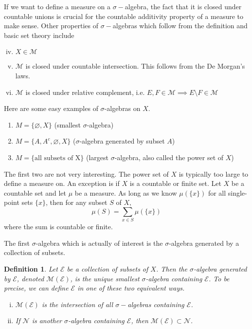\documentclass[12pt]{amsart}         %
\newtheorem{definition}{Definition}[section]
\theoremstyle{remark}
\begin{document}
If we want to define a measure on a $\sigma-$algebra, the fact that it is closed under countable unions is crucial for the countable additivity property of a measure to make sense. Other properties of $\sigma-$algebras which follow from the definition and basic set theory include
\begin{enumerate}[(i)]\setcounter{enumi}{3}
	\item $X \in \mathcal{M}$ 
	\item $\mathcal{M}$ is closed under countable intersection. This follows from the De Morgan's laws.
	\item $\mathcal{M}$ is closed under relative complement, i.e. $E, F \in \mathcal{M} \implies E \setminus F \in \mathcal{M}$
\end{enumerate}

Here are some easy examples of $\sigma$-algebras on $X$.
\begin{enumerate}
    \item $M = \{ \varnothing, X \}$ (smallest $\sigma$-algebra)
    \item $M = \{ A, A^c, \varnothing, X\}$ ($\sigma$-algebra generated by subset $A$)
    \item $M = \{ \text{all subsets of X} \}$ (largest $\sigma$-algebra, also called the power set of $X$)
\end{enumerate}

The first two are not very interesting. The power set of $X$ is typically too large to define a measure on. An exception is if $X$ is a countable or finite set. Let $X$ be a countable set and let $\mu$ be a measure. As long as we know $\mu(\{x\})$ for all single-point sets $\{x\}$, then for any subset $S$ of $X$,
\[
\mu(S) = \sum_{x \in S} \mu(\{x\})
\]
where the sum is countable or finite.

The first $\sigma$-algebra which is actually of interest is the $\sigma$-algebra generated by a collection of subsets.

\begin{definition}Let $\mathcal{E}$ be a collection of subsets of $X$. Then the \emph{$\sigma$-algebra generated by $\mathcal{E}$}, denoted $\mathcal{M}(\mathcal{E})$, is the unique smallest $\sigma$-algebra containing $\mathcal{E}$. To be precise, we can define $\mathcal{E}$ in one of these two equivalent ways.
\begin{enumerate}[(i)]
\item $\mathcal{M}(\mathcal{E})$ is the intersection of all $\sigma-$algebras containing $\mathcal{E}$.
\item If $\mathcal{N}$ is another $\sigma$-algebra containing $\mathcal{E}$, then $\mathcal{M}(\mathcal{E}) \subset \mathcal{N}$.
\end{enumerate}
\end{definition}
\end{document}
